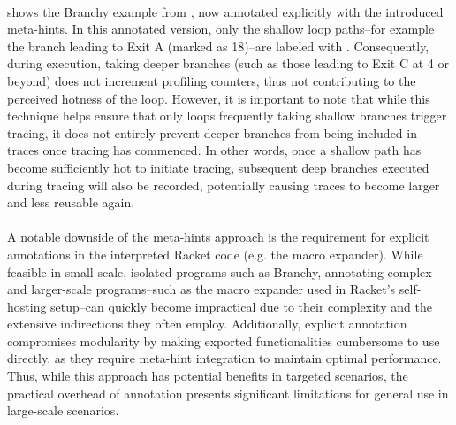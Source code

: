 
    \paragraph{}%
       shows the Branchy example from , now annotated explicitly with the introduced meta-hints. In this annotated version, only the shallow loop paths--for example the branch leading to Exit A (marked as \textcircled{\scriptsize{18}})--are labeled with . Consequently, during execution, taking deeper branches (such as those leading to Exit C at \textcircled{\scriptsize{4}} or beyond) does not increment profiling counters, thus not contributing to the perceived hotness of the loop. However, it is important to note that while this technique helps ensure that only loops frequently taking shallow branches trigger tracing, it does not entirely prevent deeper branches from being included in traces once tracing has commenced. In other words, once a shallow path has become sufficiently hot to initiate tracing, subsequent deep branches executed during tracing will also be recorded, potentially causing traces to become larger and less reusable again.

    \paragraph{}%
      A notable downside of the meta-hints approach is the requirement for explicit annotations in the interpreted Racket code (e.g. the macro expander). While feasible in small-scale, isolated programs such as Branchy, annotating complex and larger-scale programs--such as the macro expander used in Racket's self-hosting setup--can quickly become impractical due to their complexity and the extensive indirections they often employ. Additionally, explicit annotation compromises modularity by making exported functionalities cumbersome to use directly, as they require meta-hint integration to maintain optimal performance. Thus, while this approach has potential benefits in targeted scenarios, the practical overhead of annotation presents significant limitations for general use in large-scale scenarios.



